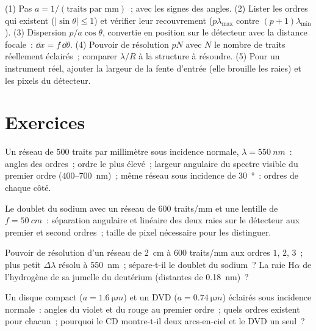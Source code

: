 \begin{method}\label{met:b2:gratings:method}
(1) Pas $a = 1/(\text{traits par mm})$~;  avec les
signes des angles. (2) Lister les ordres qui existent ($|\sin\theta| \le 1$)
et vérifier leur recouvrement ($p\lambda_{\max}$ contre $(p + 1)\lambda_{\min}$). (3)
Dispersion $p/a\cos\theta$, convertie en position sur le détecteur avec
la distance focale~: $\dd x = f\,\dd\theta$. (4) Pouvoir de résolution $pN$ avec $N$ le
nombre de traits réellement éclairés~; comparer $\lambda/R$ à la structure à
résoudre. (5) Pour un instrument réel, ajouter la largeur de la fente d'entrée (elle
brouille les raies) et les pixels du détecteur.
\end{method}

\section{Exercices}

\begin{exercise}[$\star$]\label{exo:b2:gratings:1}
Un réseau de $500$ traits par millimètre sous incidence normale, $\lambda =
\qty{550}{nm}$~: angles des ordres~; ordre le plus élevé~; largeur angulaire du
spectre visible du premier ordre ($400$--\qty{700}{nm})~; même réseau sous
incidence de \qty{30}{\degree}~: ordres de chaque côté.
\end{exercise}

\begin{exercise}[$\star$]\label{exo:b2:gratings:2}
Le doublet du sodium avec un réseau de $600$ traits/mm et une lentille de $f =
\qty{50}{cm}$~: séparation angulaire et linéaire des deux raies sur le
détecteur aux premier et second ordres~; taille de pixel nécessaire pour les
distinguer.
\end{exercise}

\begin{exercise}[$\star$]\label{exo:b2:gratings:3}
Pouvoir de résolution d'un réseau de \qty{2}{cm} à $600$ traits/mm aux ordres $1$, $2$,
$3$~; plus petit $\Delta\lambda$ résolu à \qty{550}{nm}~; sépare-t-il le doublet du
sodium~? La raie H$\alpha$ de l'hydrogène de sa jumelle du deutérium (distantes de \qty{0.18}{nm})~?
\end{exercise}

\begin{exercise}[$\star$]\label{exo:b2:gratings:4}
Un disque compact ($a = \qty{1.6}{\micro m}$) et un DVD ($a = \qty{0.74}{\micro m}$) éclairés sous
incidence normale~: angles du violet et du rouge au premier ordre~; quels ordres
existent pour chacun~; pourquoi le CD montre-t-il deux arcs-en-ciel et le DVD un seul~?
\end{exercise}

